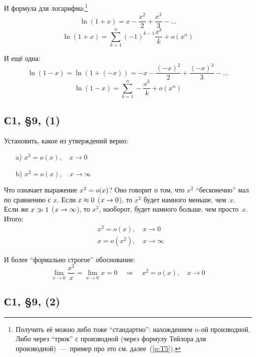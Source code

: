 \documentclass[a4paper,12pt]{article}
\begin{document}
  И формула для логарифма:\footnote{
    Получить её можно либо тоже ``стандартно'': нахождением $n$-ой производной.
    Либо через ``трюк'' с производной (через формулу Тейлора для производной)~---~пример про это см. далее~(\ref{p:T5}).
  }
  \[
    \ln{(1 + x)} = x - \frac{x^2}{2} + \frac{x^3}{3} - \ldots
  \]
  \begin{equation}\label{eq:log-plus}
    \ln{(1 + x)} = \sum_{k = 1}^n (-1)^{k - 1} \frac{x^k}{k} + o(x^n)
  \end{equation}

  И ещё одна:
  \[
    \ln{(1 - x)} = \ln{(1 + (-x))} = -x - \frac{(-x)^2}{2} + \frac{(-x)^3}{3} - \ldots
  \]
  \begin{equation}\label{eq:log-minus}
    \ln{(1 - x)} = \sum_{k = 1}^n - \frac{x^k}{k} + o(x^n)
  \end{equation}

  
  \subsection{С1, \S 9, (1)}
  
  Установить, какое из утверждений верно:
  \begin{itemize}
    \item[a)] $x^2 = o(x),\quad x \to 0$
    \item[b)] $x^2 = o(x),\quad x \to \infty$
  \end{itemize}
  
  \begin{solution}
    Что означает выражение $x^2 \hm= o(x)$?
    Оно говорит о том, что $x^2$ ``бесконечно'' мал по сравнению с $x$.
    Если $x \hm\approx 0$ ($x \hm\to 0$), то $x^2$ будет намного меньше, чем~$x$.
    Если же $x \hm\gg 1$ ($x \hm\to \infty$), то $x^2$, наоборот, будет намного больше, чем просто~$x$.
    Итого:
    \[
      \begin{aligned}
        &x^2 = o(x),\quad x \to 0\\
        &x = o(x^2),\quad x \to \infty
      \end{aligned}
    \]
    
    И более ``формально строгое'' обоснование:
    \[
      \lim_{x \to 0} \frac{x^2}{x} = \lim_{x \to 0} x = 0 \quad\Rightarrow\quad x^2 = o(x),\quad x \to 0
    \]
  \end{solution}
  
  
  
  \subsection{С1, \S 9, (2)}
  
\end{document}
